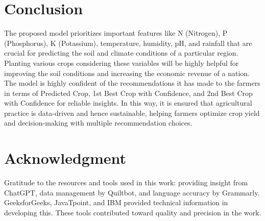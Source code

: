 \documentclass[conference]{IEEEtran}
\begin{document}
\section{Conclusion}
The proposed model prioritizes important features like N (Nitrogen), P (Phosphorus), K (Potassium), temperature, humidity, pH, and rainfall that are crucial for predicting the soil and climate conditions of a particular region. Planting various crops considering these variables will be highly helpful for improving the soil conditions and increasing the economic revenue of a nation. The model is highly confident of the recommendations it has made to the farmers in terms of Predicted Crop, 1st Best Crop with Confidence, and 2nd Best Crop with Confidence for reliable insights. In this way, it is ensured that agricultural practice is data-driven and hence sustainable, helping farmers optimize crop yield and decision-making with multiple recommendation choices. 







\section*{Acknowledgment}

Gratitude to the resources and tools used in this work: providing insight from ChatGPT, data management by Quiltbot, and language accuracy by Grammarly. GeeksforGeeks, JavaTpoint, and IBM provided technical information in developing this. These tools contributed toward quality and precision in the work.

\cite{bharathi2022experimental}
\cite{ramadasan2023classification}
\cite{kashyap2021sensing}
\cite{ahmed2022impact}
\cite{shehadeh2021machine}
\cite{geeksforlearn:2024}


    
\end{document}
